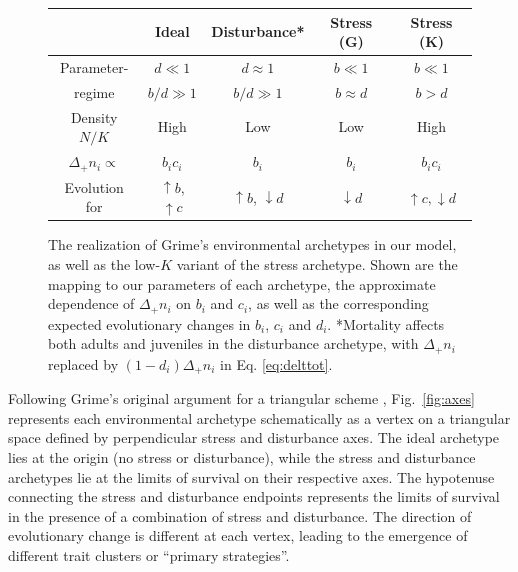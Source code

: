 \documentclass[11pt]{article}
\begin{document}
\begin{figure}
\centering
\begin{tabular}{*{5}{c}}
  & Ideal & Disturbance* & Stress (G) & Stress (K) \\ \hline
  Parameter- & $d \ll 1$ & $d \approx 1$ & $b \ll 1$ & $b \ll 1$ \\
  regime & $b/d\gg 1$ & $b/d\gg 1$ & $b\approx d$ & $b>d$ \\
  Density $N/K$  & High & Low & Low & High \\
  $\Delta_+ n_i\propto$ & $b_i c_i$ & $b_i$ & $b_i$ & $b_i c_i$ \\
  Evolution for & $\uparrow b$, $ \uparrow c$ & $\uparrow b$, $\downarrow d$ & $\downarrow d$ & $\uparrow c, \downarrow d$
\end{tabular}
\caption{\label{fig:table} The realization of Grime's environmental archetypes in our model, as well as the low-$K$ variant of the stress archetype. Shown are the mapping to our parameters of each archetype, the approximate dependence of $\Delta_+ n_i$ on $b_i$ and $c_i$, as well as the corresponding expected evolutionary changes in $b_i$, $c_i$ and $d_i$. *Mortality affects both adults and juveniles in the disturbance archetype, with $\Delta_+ n_i$ replaced by $(1-d_i)\Delta_+ n_i$ in Eq. \eqref{eq:delttot}.}
\end{figure}

Following Grime's original argument for a triangular scheme \citep{grime_1977}, Fig.~\ref{fig:axes} represents each environmental archetype schematically as a vertex on a triangular space defined by perpendicular stress and disturbance axes. The ideal archetype lies at the origin (no stress or disturbance), while the stress and disturbance archetypes lie at the limits of survival on their respective axes. The hypotenuse connecting the stress and disturbance endpoints represents the limits of survival in the presence of a combination of stress and disturbance. The direction of evolutionary change is different at each vertex, leading to the emergence of different trait clusters or ``primary strategies''. 
\end{document}
